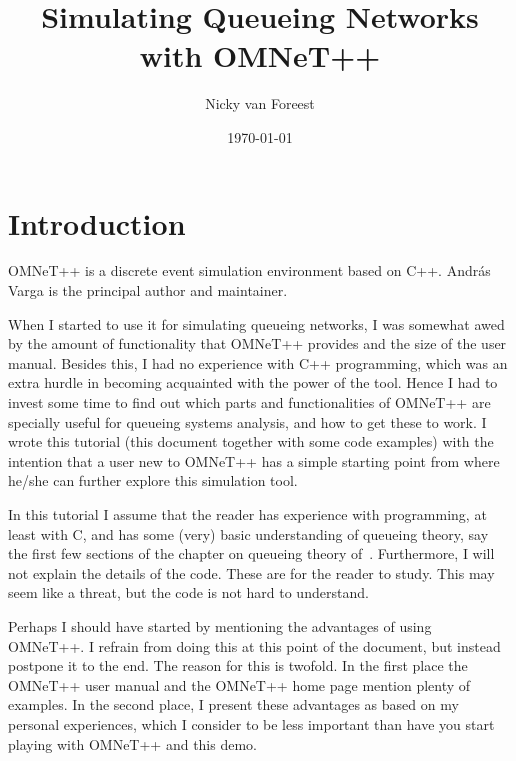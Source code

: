 \documentclass[a4paper]{article}
\date{\today}
\author{Nicky van Foreest}
\title{Simulating Queueing Networks with OMNeT++}
\begin{document}
\maketitle {}
\tableofcontents

\section{Introduction}
\label{sec:introduction}
OMNeT++ is a discrete event simulation environment based on C++. Andr{\'a}s
Varga is the principal author and maintainer.

When I started to use it for simulating queueing networks, I was
somewhat awed by the amount of functionality that OMNeT++ provides and
the size of the user manual. Besides this, I had no experience with
C++ programming, which was an extra hurdle in becoming acquainted with
the power of the tool. Hence I had to invest some time to find out
which parts and functionalities of OMNeT++ are specially useful for
queueing systems analysis, and how to get these to work. I wrote this
tutorial (this document together with some code examples) with the
intention that a  user new to OMNeT++ has a simple starting point from
where he/she can further explore this simulation tool.

In this tutorial I assume that the reader has experience with
programming, at least with C, and has some (very) basic understanding
of queueing theory, say the first few sections of the chapter on
queueing theory of~\cite{Ross93}.  Furthermore, I will not explain the
details of the code. These are for the reader to study. This may seem
like a threat, but the code is not hard to understand.

Perhaps I should have started by mentioning the advantages of using
OMNeT++. I refrain from doing this at this point of the document, but
instead postpone it to the end. The reason for this is twofold. In the
first place the OMNeT++ user manual and the OMNeT++ home page mention
plenty of examples. In the second place, I present these advantages as
based on my personal experiences, which I consider to be less
important than have you start playing with OMNeT++ and this demo.
\end{document}
